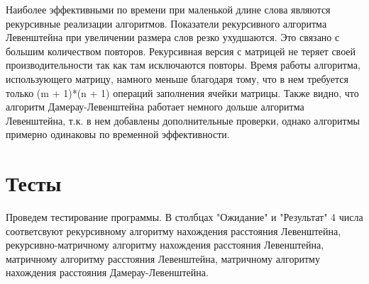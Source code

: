 \documentclass[12pt]{report}
\begin{document}


\par
Наиболее эффективными по времени при маленькой длине слова являются рекурсивные реализации алгоритмов. Показатели рекурсивного алгоритма Левенштейна при увеличении размера слов резко ухудшаются. Это связано с большим количеством повторов. Рекурсивная версия с матрицей не теряет своей производительности так как там исключаются повторы. Время работы алгоритма, использующего матрицу, намного меньше благодаря тому, что в нем требуется только (m + 1)*(n + 1) операций заполнения ячейки матрицы. Также видно, что алгоритм Дамерау-Левенштейна работает немного дольше алгоритма Левенштейна, т.к. в нем добавлены дополнительные проверки, однако алгоритмы примерно одинаковы по временной эффективности.

\section{Тесты}

\par
Проведем тестирование программы. В столбцах "Ожидание" и "Результат" 4 числа соответсвуют рекурсивному алгоритму нахождения расстояния Левенштейна, рекурсивно-матричному алгоритму нахождения расстояния Левенштейна, матричному алгоритму расстояния Левенштейна, матричному алгоритму нахождения расстояния Дамерау-Левенштейна.
\end{document}
